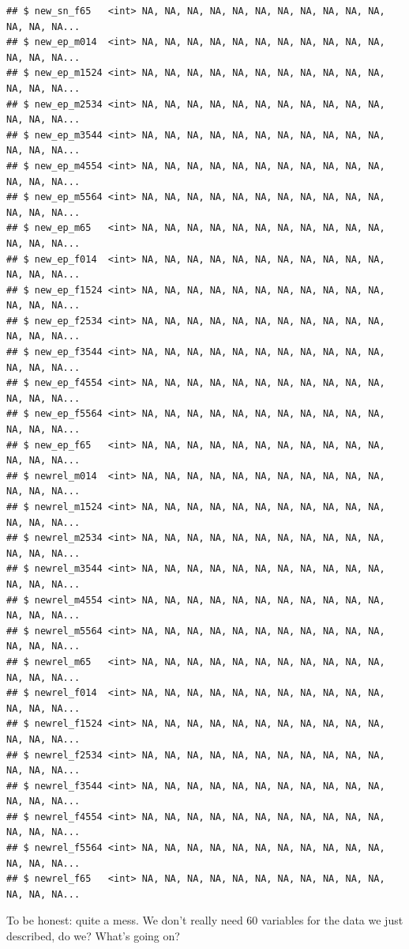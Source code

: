 \documentclass[]{tufte-book}
\begin{document}
\begin{verbatim}
## $ new_sn_f65   <int> NA, NA, NA, NA, NA, NA, NA, NA, NA, NA, NA, NA, NA, NA...
## $ new_ep_m014  <int> NA, NA, NA, NA, NA, NA, NA, NA, NA, NA, NA, NA, NA, NA...
## $ new_ep_m1524 <int> NA, NA, NA, NA, NA, NA, NA, NA, NA, NA, NA, NA, NA, NA...
## $ new_ep_m2534 <int> NA, NA, NA, NA, NA, NA, NA, NA, NA, NA, NA, NA, NA, NA...
## $ new_ep_m3544 <int> NA, NA, NA, NA, NA, NA, NA, NA, NA, NA, NA, NA, NA, NA...
## $ new_ep_m4554 <int> NA, NA, NA, NA, NA, NA, NA, NA, NA, NA, NA, NA, NA, NA...
## $ new_ep_m5564 <int> NA, NA, NA, NA, NA, NA, NA, NA, NA, NA, NA, NA, NA, NA...
## $ new_ep_m65   <int> NA, NA, NA, NA, NA, NA, NA, NA, NA, NA, NA, NA, NA, NA...
## $ new_ep_f014  <int> NA, NA, NA, NA, NA, NA, NA, NA, NA, NA, NA, NA, NA, NA...
## $ new_ep_f1524 <int> NA, NA, NA, NA, NA, NA, NA, NA, NA, NA, NA, NA, NA, NA...
## $ new_ep_f2534 <int> NA, NA, NA, NA, NA, NA, NA, NA, NA, NA, NA, NA, NA, NA...
## $ new_ep_f3544 <int> NA, NA, NA, NA, NA, NA, NA, NA, NA, NA, NA, NA, NA, NA...
## $ new_ep_f4554 <int> NA, NA, NA, NA, NA, NA, NA, NA, NA, NA, NA, NA, NA, NA...
## $ new_ep_f5564 <int> NA, NA, NA, NA, NA, NA, NA, NA, NA, NA, NA, NA, NA, NA...
## $ new_ep_f65   <int> NA, NA, NA, NA, NA, NA, NA, NA, NA, NA, NA, NA, NA, NA...
## $ newrel_m014  <int> NA, NA, NA, NA, NA, NA, NA, NA, NA, NA, NA, NA, NA, NA...
## $ newrel_m1524 <int> NA, NA, NA, NA, NA, NA, NA, NA, NA, NA, NA, NA, NA, NA...
## $ newrel_m2534 <int> NA, NA, NA, NA, NA, NA, NA, NA, NA, NA, NA, NA, NA, NA...
## $ newrel_m3544 <int> NA, NA, NA, NA, NA, NA, NA, NA, NA, NA, NA, NA, NA, NA...
## $ newrel_m4554 <int> NA, NA, NA, NA, NA, NA, NA, NA, NA, NA, NA, NA, NA, NA...
## $ newrel_m5564 <int> NA, NA, NA, NA, NA, NA, NA, NA, NA, NA, NA, NA, NA, NA...
## $ newrel_m65   <int> NA, NA, NA, NA, NA, NA, NA, NA, NA, NA, NA, NA, NA, NA...
## $ newrel_f014  <int> NA, NA, NA, NA, NA, NA, NA, NA, NA, NA, NA, NA, NA, NA...
## $ newrel_f1524 <int> NA, NA, NA, NA, NA, NA, NA, NA, NA, NA, NA, NA, NA, NA...
## $ newrel_f2534 <int> NA, NA, NA, NA, NA, NA, NA, NA, NA, NA, NA, NA, NA, NA...
## $ newrel_f3544 <int> NA, NA, NA, NA, NA, NA, NA, NA, NA, NA, NA, NA, NA, NA...
## $ newrel_f4554 <int> NA, NA, NA, NA, NA, NA, NA, NA, NA, NA, NA, NA, NA, NA...
## $ newrel_f5564 <int> NA, NA, NA, NA, NA, NA, NA, NA, NA, NA, NA, NA, NA, NA...
## $ newrel_f65   <int> NA, NA, NA, NA, NA, NA, NA, NA, NA, NA, NA, NA, NA, NA...
\end{verbatim}

To be honest: quite a mess. We don't really need 60 variables for the data we just described, do we? What's going on?
\end{document}
